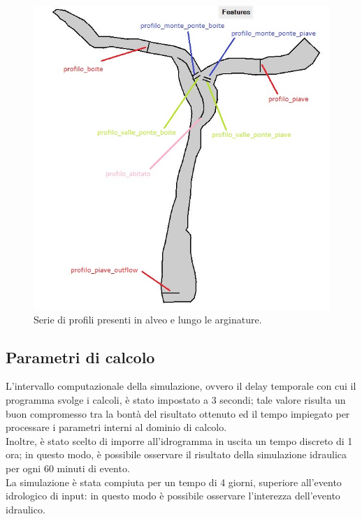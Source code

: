\begin{figure}[htb] \centering
    \includegraphics[scale=0.7]{immagini/profili.JPG}
    \caption{Serie di profili presenti in alveo e lungo le arginature.}
    \label{figure:profili}
\end{figure}

\subsection{Parametri di calcolo}
L'intervallo computazionale della simulazione, ovvero il delay temporale con cui il programma svolge i calcoli, è stato impostato a 3 secondi; tale valore risulta un buon compromesso tra la bontà del risultato ottenuto ed il tempo impiegato per processare i parametri interni al dominio di calcolo.\\
Inoltre, è stato scelto di imporre all'idrogramma in uscita un tempo discreto di 1 ora; in questo modo, è possibile osservare il risultato della simulazione idraulica per ogni 60 minuti di evento.\\
La simulazione è stata compiuta per un tempo di 4 giorni, superiore all'evento idrologico di input: in questo modo è possibile osservare l'interezza dell'evento idraulico. 